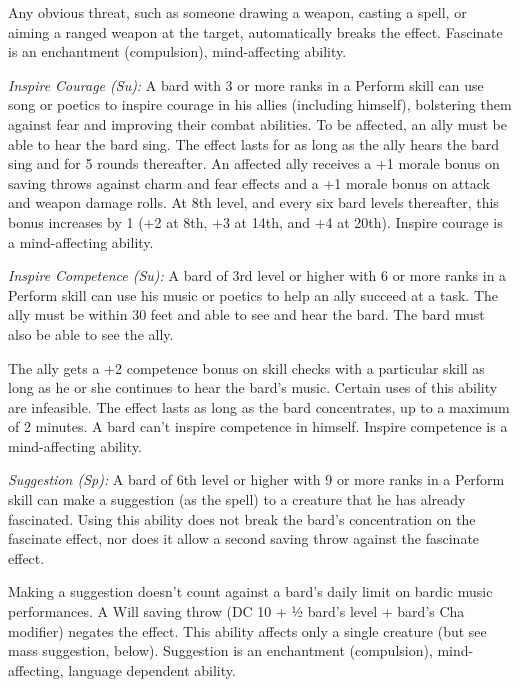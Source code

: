 \documentclass[10pt,a4paper,twocolumn]{d20}
\begin{document}
{Any obvious threat, such as someone drawing a weapon, casting a spell, or aiming a ranged weapon at the target, automatically breaks the effect. Fascinate is an enchantment (compulsion), mind-affecting ability.

\textit{Inspire Courage (Su):} A bard with 3 or more ranks in a Perform skill can use song or poetics to inspire courage in his allies (including himself), bolstering them against fear and improving their combat abilities. To be affected, an ally must be able to hear the bard sing. The effect lasts for as long as the ally hears the bard sing and for 5 rounds thereafter. An affected ally receives a +1 morale bonus on saving throws against charm and fear effects and a +1 morale bonus on attack and weapon damage rolls. At 8th level, and every six bard levels thereafter, this bonus increases by 1 (+2 at 8th, +3 at 14th, and +4 at 20th). Inspire courage is a mind-affecting ability.

\textit{Inspire Competence (Su):} A bard of 3rd level or higher with 6 or more ranks in a Perform skill can use his music or poetics to help an ally succeed at a task. The ally must be within 30 feet and able to see and hear the bard. The bard must also be able to see the ally.

The ally gets a +2 competence bonus on skill checks with a particular skill as long as he or she continues to hear the bard’s music. Certain uses of this ability are infeasible. The effect lasts as long as the bard concentrates, up to a maximum of 2 minutes. A bard can’t inspire competence in himself. Inspire competence is a mind-affecting ability.

\textit{Suggestion (Sp):} A bard of 6th level or higher with 9 or more ranks in a Perform skill can make a suggestion (as the spell) to a creature that he has already fascinated. Using this ability does not break the bard’s concentration on the fascinate effect, nor does it allow a second saving throw against the fascinate effect.

Making a suggestion doesn’t count against a bard’s daily limit on bardic music performances. A Will saving throw (DC 10 + ½ bard’s level + bard’s Cha modifier) negates the effect. This ability affects only a single creature (but see mass suggestion, below). Suggestion is an enchantment (compulsion), mind-affecting, language dependent ability.

}
\end{document}
